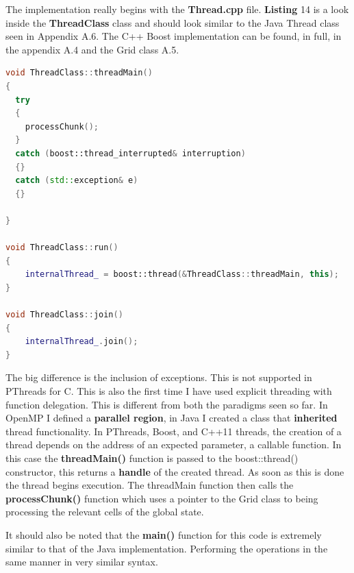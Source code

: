 \documentclass[11pt]{article} %
\begin{document}
The implementation really begins with the {\bf Thread.cpp} file. {\bf Listing} 14 is a look inside the {\bf ThreadClass} class and should look similar to the Java Thread class seen in Appendix A.6. The C++ Boost implementation can be found, in full, in the appendix A.4 and the Grid class A.5.
\begin{lstlisting}[language=c++, caption={Boost implementation Thread class methods}]
void ThreadClass::threadMain()
{
  try
  {
    processChunk();
  }
  catch (boost::thread_interrupted& interruption)
  {}
  catch (std::exception& e)
  {}

}

void ThreadClass::run()
{
	internalThread_ = boost::thread(&ThreadClass::threadMain, this);
}

void ThreadClass::join()
{
    internalThread_.join();
}
\end{lstlisting}
The big difference is the inclusion of exceptions. This is not supported in PThreads for C. This is also the first time I have used explicit threading with function delegation. This is different from both the paradigms seen so far. In OpenMP I defined a {\bf parallel region}, in Java I created a class that {\bf inherited} thread functionality. In PThreads, Boost, and C++11 threads, the creation of a thread depends on the address of an expected parameter, a callable function. In this case the {\bf threadMain()} function is passed to the boost::thread() constructor, this returns a {\bf handle} of the created thread. As soon as this is done the thread begins execution. The threadMain function then calls the {\bf processChunk()} function which uses a pointer to the Grid class to being processing the relevant cells of the global state.

It should also be noted that the {\bf main()} function for this code is extremely similar to that of the Java implementation. Performing the operations in the same manner in very similar syntax. 
\end{document}
